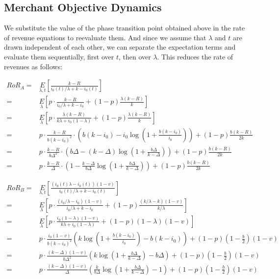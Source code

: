 

\subsection{Merchant Objective Dynamics}
We substitute the value of the phase transition point obtained above in the rate of revenue equations to reevaluate them. 
And since we assume that $\lambda$ and $t$ are drawn independent of each other, we can separate the expectation terms and evaluate them sequentially, first over $t$, then over $\lambda$. This reduces the rate of revenues as follows:

\begin{align*}
RoR_A =& \underset{\lambda, t}E\left[\frac{k-R}{i_0(t)/\lambda + k - i_0(t)}\right]\\
                                       =& \underset{\lambda}E\left[p\cdot\frac{k-R}{i_0/\lambda + k - i_0} + (1-p)\frac{\lambda(k-R)}{k}\right]\\
                                       =& \underset{\lambda}E\left[p\cdot\frac{\lambda(k-R)}{k\lambda + i_0(1-\lambda)} + (1-p)\frac{\lambda(k-R)}{k}\right]\\
                                       =& p\cdot\frac{k-R}{b(k-i_0)^2}\cdot\left(b(k-i_0) - i_0 \log\left(1 + \frac{b(k-i_0)}{i_0}\right)\right) + (1-p)\frac{b(k-R)}{2k}\\
                                       =& p\cdot\frac{k-R}{b\Delta^2}\cdot\left(b\Delta - (k-\Delta)\log\left(1+\frac{b\Delta}{k-\Delta}\right)\right) + (1-p)\frac{b(k-R)}{2k}\\
                                       =& p\cdot\frac{k-R}{\Delta}\cdot\left(1 - \frac{k-\Delta}{b\Delta}\log\left(1+\frac{b\Delta}{k-\Delta}\right)\right) + (1-p)\frac{b(k-R)}{2k}
\end{align*}

\begin{align*}
RoR_B =& \underset{\lambda, t}E\left[\frac{(i_0(t)\lambda - i_0(t))(1-v)}{i_0(t)/\lambda + k - i_0(t)}\right]\\
                                     =& \underset{\lambda}E\left[p\cdot\frac{(i_0/\lambda - i_0)(1-v)}{i_0/\lambda + k - i_0} + (1-p)\frac{(k/\lambda - k)(1-v)}{k/\lambda}\right]\\
                                     =& \underset{\lambda}E\left[p\cdot\frac{i_0(1-\lambda)(1-v)}{k\lambda + i_0(1-\lambda)} + (1-p)(1-\lambda)(1-v)\right]\\
                                     =& p\cdot\frac{i_0(1-v)}{b(k-i_0)^2}\left(k\log\left(1+\frac{b(k-i_0)}{i_0}\right) - b(k-i_0)\right) + (1-p)(1-\frac{b}{2})(1-v)\\
                                     =& p\cdot\frac{(k-\Delta)(1-v)}{b\Delta^2}\left(k\log\left(1+\frac{b\Delta}{k-\Delta}\right) - b\Delta\right) + (1-p)(1-\frac{b}{2})(1-v)\\
                                     =& p\cdot\frac{(k-\Delta)(1-v)}{\Delta}\left(\frac{k}{b\Delta}\log\left(1+\frac{b\Delta}{k-\Delta}\right) - 1\right) + (1-p)(1-\frac{b}{2})(1-v)\label{eq:rorB_eval}
\end{align*}

